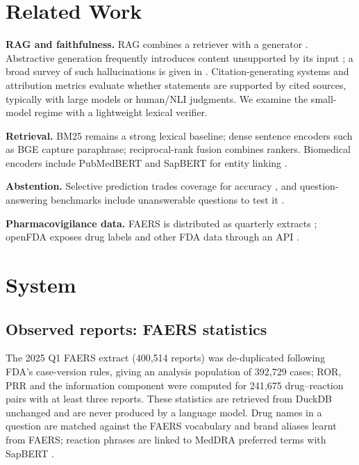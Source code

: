 \documentclass[conference]{IEEEtran}
\begin{document}
\section{Related Work}
\textbf{RAG and faithfulness.} RAG combines a retriever with a generator \cite{lewis2020rag}. Abstractive generation frequently introduces content unsupported by its input \cite{maynez2020faithfulness}; a broad survey of such hallucinations is given in \cite{ji2023hallucination}. Citation-generating systems \cite{gao2023alce} and attribution metrics \cite{rashkin2023ais} evaluate whether statements are supported by cited sources, typically with large models or human/NLI judgments. We examine the small-model regime with a lightweight lexical verifier.

\textbf{Retrieval.} BM25 \cite{robertson2009bm25} remains a strong lexical baseline; dense sentence encoders such as BGE \cite{xiao2023cpack} capture paraphrase; reciprocal-rank fusion \cite{cormack2009rrf} combines rankers. Biomedical encoders include PubMedBERT \cite{gu2021pubmedbert} and SapBERT for entity linking \cite{liu2021sapbert}.

\textbf{Abstention.} Selective prediction trades coverage for accuracy \cite{geifman2017selective}, and question-answering benchmarks include unanswerable questions to test it \cite{rajpurkar2018squad2}.

\textbf{Pharmacovigilance data.} FAERS is distributed as quarterly extracts \cite{fda2025faers}; openFDA exposes drug labels and other FDA data through an API \cite{kasshout2016openfda}.

\section{System}
\subsection{Observed reports: FAERS statistics}
The 2025 Q1 FAERS extract (400{,}514 reports) was de-duplicated following FDA's case-version rules, giving an analysis population of 392{,}729 cases; ROR, PRR and the information component were computed for 241{,}675 drug--reaction pairs with at least three reports. These statistics are retrieved from DuckDB unchanged and are never produced by a language model. Drug names in a question are matched against the FAERS vocabulary and brand aliases learnt from FAERS; reaction phrases are linked to MedDRA preferred terms with SapBERT \cite{liu2021sapbert}.
\end{document}
